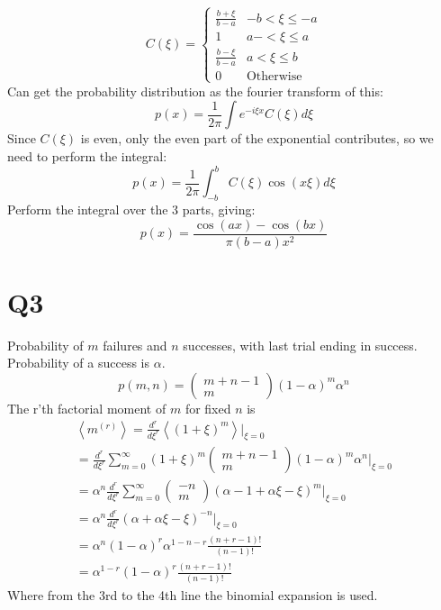 \documentclass[12pt]{article}
\begin{document}
\begin{equation}
	C(\xi) = 
	\begin{cases}
		\frac{b+\xi}{b-a} & -b<\xi\leq-a \\
		1 & a-<\xi\leq a\\
		\frac{b-\xi}{b-a} & a<\xi\leq b \\
		0 & \text{Otherwise}
	\end{cases}
\end{equation}
Can get the probability distribution as the fourier transform of this:
\begin{equation}
	p(x) = \frac{1}{2\pi}\int e^{-i\xi x}C(\xi)d\xi
\end{equation}
Since $C(\xi)$ is even, only the even part of the exponential contributes, so we need to perform the integral:
\begin{equation}
	p(x) = \frac{1}{2\pi}\int_{-b}^b C(\xi)\cos(x\xi)d\xi
\end{equation}
Perform the integral over the 3 parts, giving:
\begin{equation}
	p(x) = \frac{\cos(ax)-\cos(bx)}{\pi(b-a)x^2}
\end{equation}
\section*{Q3}
Probability of $m$ failures and $n$ successes, with last trial ending in success. Probability of a success is $\alpha$.
\begin{equation}
	p(m, n) = \left(\begin{matrix}m+n-1\\m\end{matrix}\right)(1-\alpha)^m\alpha^n
\end{equation}
The r'th factorial moment of $m$ for fixed $n$ is
\begin{align*}
	\left<m^{(r)}\right>=\frac{d^r}{d\xi^r}\left<(1+\xi)^m\right>\Big |_{\xi=0} \\
			    =\frac{d^r}{d\xi^r}\sum_{m=0}^\infty (1+\xi)^m \left(\begin{matrix}m+n-1\\m\end{matrix}\right)(1-\alpha)^m\alpha^n\Big|_{\xi=0} \\
			    =\alpha^n\frac{d^r}{d\xi^r}\sum_{m=0}^\infty\left(\begin{matrix}-n\\m\end{matrix}\right)(\alpha-1+\alpha\xi-\xi)^m\Big|_{\xi=0} \\
			    =\alpha^n \frac{d^r}{d\xi^r}(\alpha+\alpha\xi-\xi)^{-n}\Big|_{\xi=0} \\
			    =\alpha^n (1-\alpha)^r\alpha^{1-n-r}\frac{(n+r-1)!}{(n-1)!} \\
			    =\alpha^{1-r}(1-\alpha)^r\frac{(n+r-1)!}{(n-1)!}
\end{align*}
Where from the 3rd to the 4th line the binomial expansion is used.
\end{document}
